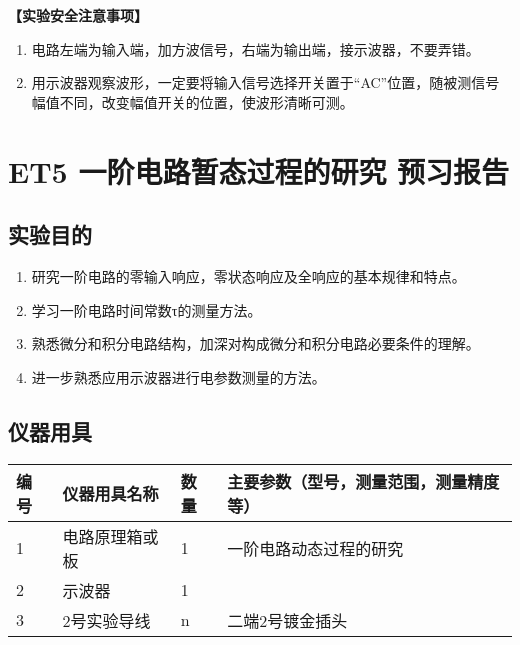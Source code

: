 \documentclass[dvipsnames, svgnames,a4paper,11pt]{article}
\begin{document}
	\textbf{【实验安全注意事项】}	
	\begin{enumerate}
		\item 电路左端为输入端，加方波信号，右端为输出端，接示波器，不要弄错。
		\item 用示波器观察波形，一定要将输入信号选择开关置于“AC”位置，随被测信号幅值不同，改变幅值开关的位置，使波形清晰可测。
		
	\end{enumerate}
	
	\clearpage
	\tableofcontents
	\clearpage
	
	
	
	
	\setcounter{section}{0}
	\section{ET5 一阶电路暂态过程的研究 \quad\heiti 预习报告}
	
	\subsection{实验目的}
	\begin{enumerate}
		\item 研究一阶电路的零输入响应，零状态响应及全响应的基本规律和特点。
		\item 学习一阶电路时间常数τ的测量方法。
		\item 熟悉微分和积分电路结构，加深对构成微分和积分电路必要条件的理解。
		\item 进一步熟悉应用示波器进行电参数测量的方法。
		
	\end{enumerate}
	
	\subsection{仪器用具}
	\begin{table}[htbp]
		\centering
		\renewcommand\arraystretch{1.6}
		\begin{tabular}{p{}|p{}|p{}|p{}}
			\hline
			编号& 仪器用具名称 & 数量 &  主要参数（型号，测量范围，测量精度等） \\
			\hline
			1& 电路原理箱或板 & 1 & 一阶电路动态过程的研究 \\
	
			2& 示波器 & 1 &  \\
			
			3& 2号实验导线 & n & 二端2号镀金插头  \\
			\hline

		\end{tabular}
	\end{table}
	
\end{document}
